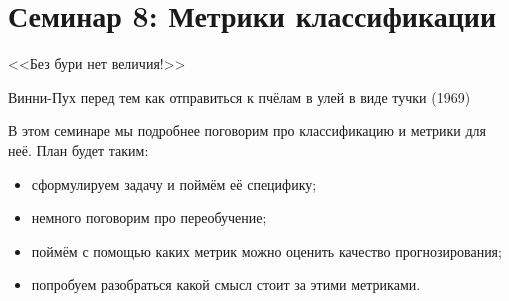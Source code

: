\documentclass[12pt, a4paper, oneside]{article}
\theoremstyle{plain} %
\theoremstyle{definition}
\begin{document}

\toggletrue{lecture}

\section*{Семинар 8:  Метрики классификации}

\epigraph{<<Без бури нет величия!>>}{Винни-Пух перед тем как отправиться к пчёлам в улей в виде тучки (1969)}

В этом семинаре мы подробнее поговорим про классификацию и метрики для неё. План будет таким: 

\begin{itemize}
	\item сформулируем задачу и поймём её специфику;
	\item немного поговорим про переобучение;
	\item поймём с помощью каких метрик можно оценить качество прогнозирования;
	\item попробуем разобраться какой смысл стоит за этими метриками.
\end{itemize}
\end{document}
